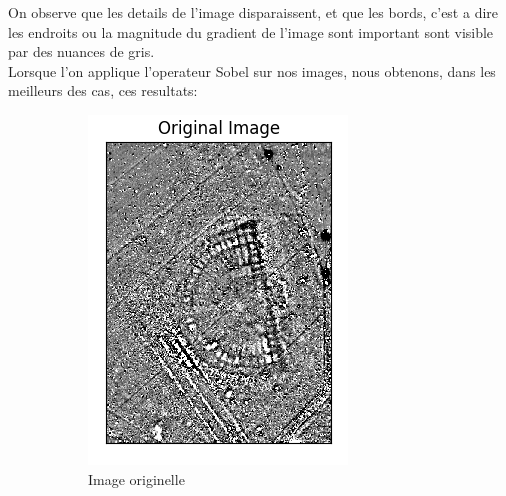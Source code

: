 \documentclass[a4paper, 12pt, titlepage, oneside]{article}
\begin{document}
	On observe que les details de l'image disparaissent, et que les bords, c'est a dire les endroits ou la magnitude du gradient de l'image sont important sont visible par des nuances de gris.\\
	Lorsque l'on applique l'operateur Sobel sur nos images, nous obtenons, dans les meilleurs des cas, ces resultats:
	\begin{figure}[!h]
		\centering
		\begin{subfigure}[b]{0.4\linewidth}
			\includegraphics[width=\linewidth]{Sobel1b.png}
			\caption{Image originelle}
		\end{subfigure}
		\begin{subfigure}[b]{0.4\linewidth}

\end{subfigure}
\end{figure}
\end{document}
